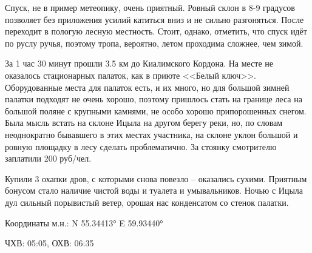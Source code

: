 Спуск, не в пример метеопику, очень приятный. Ровный склон в 8-9 градусов позволяет без приложения усилий катиться вниз и не сильно разгоняться. После переходит в пологую лесную местность. Стоит, однако, отметить, что спуск идёт по руслу ручья, поэтому тропа, вероятно, летом проходима сложнее, чем зимой.

За 1 час 30 минут прошли 3.5 км до Киалимского Кордона. На месте не оказалось стационарных палаток, как в приюте <<Белый ключ>>. Оборудованные места для палаток есть, и их много, но для большой зимней палатки подходят не очень хорошо, поэтому пришлось стать на границе леса на большой поляне с крупными камнями, не особо хорошо припорошенных снегом. Была мысль встать на склоне Ицыла на другом берегу реки, но, по словам неоднократно бывавшего в этих местах участника, на склоне уклон большой и ровную площадку в лесу сделать проблематично. За стоянку смотрителю заплатили 200 руб/чел.

Купили 3 охапки дров, с которыми снова повезло -- оказались сухими. Приятным бонусом стало наличие чистой воды и туалета и умывальников. Ночью с Ицыла дул сильный порывистый ветер, орошая нас конденсатом со стенок палатки.

Координаты м.н.: N 55.34413° E 59.93440°

ЧХВ: 05:05, ОХВ: 06:35

\clearpage